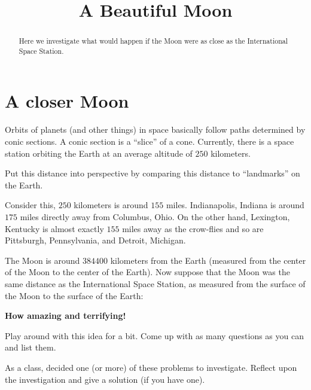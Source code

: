 \documentclass[handout,nonumbers,space]{ximera}
\title{A Beautiful Moon}
\begin{document}
\begin{abstract}
Here we investigate what would happen if the Moon were as close as the
International Space Station.
\end{abstract}
\maketitle

\section*{A closer Moon}

Orbits of planets (and other things) in space basically follow paths
determined by conic sections. A conic section is a ``slice'' of a
cone. Currently, there is a space station orbiting the Earth at an average
altitude of $250$ kilometers.

\begin{problem}
Put this distance into perspective by comparing this distance to
``landmarks'' on the Earth.
\begin{freeResponse}
Consider this, $250$ kilometers is around $155$ miles. Indianapolis,
Indiana is around $175$ miles directly away from Columbus, Ohio. On
the other hand, Lexington, Kentucky is almost exactly $155$ miles away
as the crow-flies and so are Pittsburgh, Pennsylvania, and Detroit,
Michigan.
\end{freeResponse}
\end{problem}

The Moon is around $384400$ kilometers from the Earth (measured from
the center of the Moon to the center of the Earth). Now suppose that
the Moon was the same distance as the International Space Station, as
measured from the surface of the Moon to the surface of the Earth:

\begin{center}
\textbf{How amazing and terrifying!}
\end{center}

\break

\begin{problem}
Play around with this idea for a bit. Come up with as many questions
as you can and list them.
\begin{freeResponse}
\end{freeResponse}
\end{problem}

\begin{problem}
As a class, decided one (or more) of these problems to
investigate. Reflect upon the investigation and give a solution (if
you have one).
\begin{freeResponse}
\end{freeResponse}
\end{problem}
\end{document}
